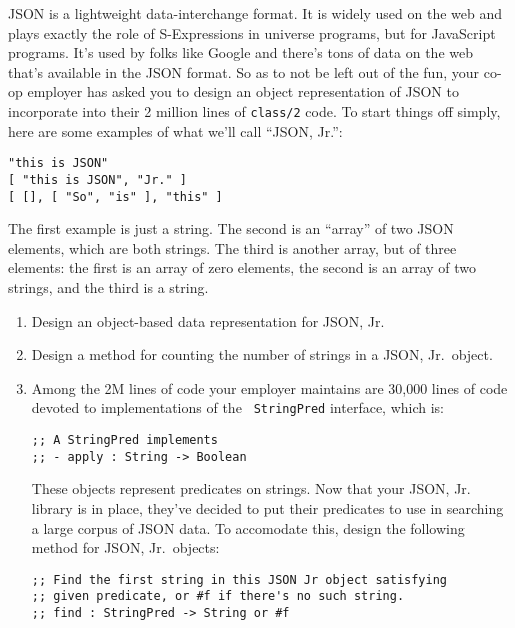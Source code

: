 \documentclass[12pt]{article}                   %
\def\pts#1{\marginpar{\footnotesize \raggedright  \fbox{#1 {\sc Points}}}}
\begin{document}
\vfill\thispagestyle{empty}
\newpage

\begin{problem} \pts{??}

JSON is a lightweight data-interchange format.  It is widely used on
the web and plays exactly the role of S-Expressions in universe
programs, but for JavaScript programs.  It's used by folks like Google
and there's tons of data on the web that's available in the JSON
format.  So as to not be left out of the fun, your co-op employer has
asked you to design an object representation of JSON to incorporate
into their 2 million lines of {\tt class/2} code.  To start things off
simply, here are some examples of what we'll call ``JSON, Jr.'':

\begin{verbatim}
"this is JSON"
[ "this is JSON", "Jr." ]
[ [], [ "So", "is" ], "this" ]
\end{verbatim}
The first example is just a string.  The second is an ``array'' of two
JSON elements, which are both strings.  The third is another array,
but of three elements: the first is an array of zero elements, the
second is an array of two strings, and the third is a string.

\begin{enumerate}
\item Design an object-based data representation for JSON, Jr.
\newpage
\item Design a method for counting the number of strings in a JSON,
  Jr.~object.
\newpage
\item Among the 2M lines of code your employer maintains are 30,000
  lines of code devoted to implementations of the {\tt
    StringPred} interface, which is:
\begin{verbatim}
;; A StringPred implements
;; - apply : String -> Boolean
\end{verbatim}
These objects represent predicates on strings.  Now that your JSON,
Jr. library is in place, they've decided to put their predicates to
use in searching a large corpus of JSON data.  To accomodate this,
design the following method for JSON, Jr.~objects:
\begin{verbatim}
;; Find the first string in this JSON Jr object satisfying
;; given predicate, or #f if there's no such string.
;; find : StringPred -> String or #f
\end{verbatim}
\end{enumerate}

\end{problem}
\end{document}
